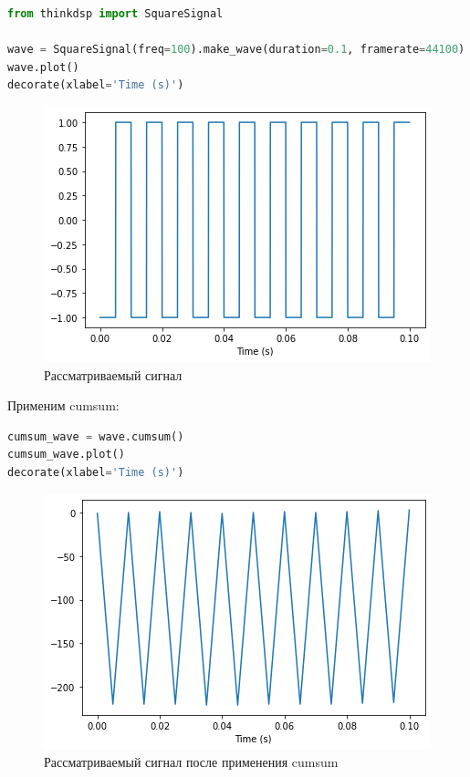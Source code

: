 \begin{lstlisting}[language=Python]
from thinkdsp import SquareSignal

wave = SquareSignal(freq=100).make_wave(duration=0.1, framerate=44100)
wave.plot()
decorate(xlabel='Time (s)')
\end{lstlisting}
\begin{figure}[H]
	\begin{center}
		\includegraphics[scale=1]{fig/lab09/lab09_4.png}
		\caption{Рассматриваемый сигнал}
	\end{center}
\end{figure}

Применим cumsum:

\begin{lstlisting}[language=Python]
cumsum_wave = wave.cumsum()
cumsum_wave.plot()
decorate(xlabel='Time (s)')
\end{lstlisting}
\begin{figure}[H]
	\begin{center}
		\includegraphics[scale=1]{fig/lab09/lab09_5.png}
		\caption{Рассматриваемый сигнал после применения cumsum}
	\end{center}
\end{figure}

